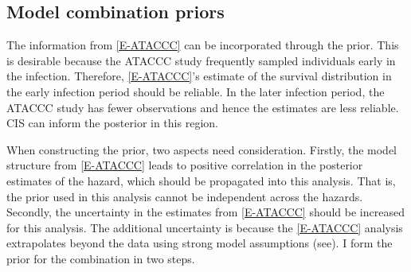 \documentclass[thesis.tex]{subfiles}
\begin{document}
\subsection{Model combination priors} \label{perf-test:sec:informative-priors}

The information from \cref{E-ATACCC} can be incorporated through the prior.
This is desirable because the ATACCC study frequently sampled individuals early in the infection.
Therefore, \cref{E-ATACCC}'s estimate of the survival distribution in the early infection period should be reliable.
In the later infection period, the ATACCC study has fewer observations and hence the estimates are less reliable.
CIS can inform the posterior in this region.

When constructing the prior, two aspects need consideration.
Firstly, the model structure from \cref{E-ATACCC} leads to positive correlation in the posterior estimates of the hazard, which should be propagated into this analysis.
That is, the prior used in this analysis cannot be independent across the hazards.
Secondly, the uncertainty in the estimates from \cref{E-ATACCC} should be increased for this analysis.
The additional uncertainty is because the \cref{E-ATACCC} analysis extrapolates beyond the data using strong model assumptions (see).
I form the prior for the combination in two steps.
\end{document}
